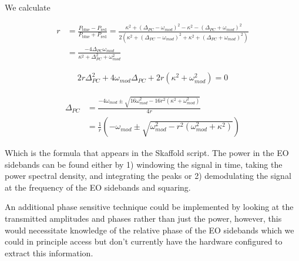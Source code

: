 \documentclass[12pt]{article}
\begin{document}
We calculate

\begin{align}
r &= \frac{P_{\text{blue}} - P_{\text{red}}}{P_{\text{blue}} + P_{\text{red}}} = \frac{\kappa^2+(\Delta_{PC}-\omega_{mod})^2 - \kappa^2-(\Delta_{PC}+\omega_{mod})^2}{2(\kappa^2+(\Delta_{PC}-\omega_{mod})^2 + \kappa^2+(\Delta_{PC}+\omega_{mod})^2)}\\
& = \frac{-4\Delta_{PC}\omega_{mod}}{\kappa^2+\Delta_{PC}^2+\omega_{mod}^2}
\end{align}

\begin{align}
2r\Delta_{PC}^2 + 4\omega_{mod}\Delta_{PC} + 2r(\kappa^2+\omega_{mod}^2) = 0 
\end{align}

\begin{align}
\Delta_{PC} &= \frac{-4\omega_{mod} \pm \sqrt{16\omega_{mod}^2 - 16r^2(\kappa^2+\omega_{mod}^2)}}{4r}\\
&= \frac{1}{r}\left(-\omega_{mod} \pm \sqrt{\omega_{mod}^2 - r^2(\omega_{mod}^2+\kappa^2)}\right)
\end{align}

Which is the formula that appears in the Skaffold script. The power in the EO sidebands can be found either by 1) windowing the signal in time, taking the power spectral density, and integrating the peaks or 2) demodulating the signal at the frequency of the EO sidebands and squaring.

An additional phase sensitive technique could be implemented by looking at the transmitted amplitudes and phases rather than just the power, however, this would necessitate knowledge of the relative phase of the EO sidebands which we could in principle access but don't currently have the hardware configured to extract this information.
\end{document}
